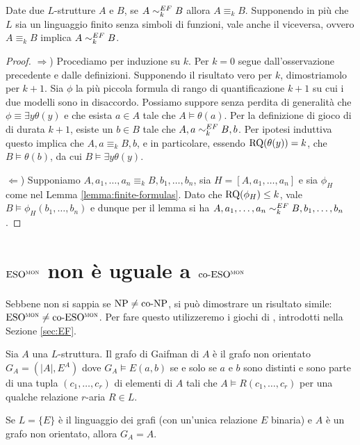 \begin{teorema}
 \label{thm:ef}
 Date due $L$-strutture $A$ e $B$, se $A \sim^{EF}_k B$ allora $A \equiv_k B$.
 Supponendo in più che $L$ sia un linguaggio finito senza simboli di funzioni,
 vale anche il viceversa, ovvero $A \equiv_k B$
 implica $A \sim^{EF}_k B$.
\end{teorema}
\begin{proof}
 $\Rightarrow$) Procediamo per induzione su $k$. Per $k=0$ segue dall'osservazione
 precedente e dalle definizioni. Supponendo il risultato vero per $k$, dimostriamolo
 per $k+1$. Sia $\phi$ la più piccola formula di rango di quantificazione $k+1$
 su cui i due modelli sono in disaccordo. Possiamo suppore senza perdita di generalità
 che $\phi \equiv \exists y \theta(y)$ e che esista $a \in A$ tale che $A \models \theta(a)$.
 Per la definizione di gioco di \EF{} di durata $k+1$, esiste un $b \in B$ tale che
 $A,a \sim^{EF}_k B,b$. Per ipotesi induttiva questo implica che
 $A,a \equiv_k B,b$, e in particolare, essendo $\operatorname{RQ}(\theta(y)) = k$, che
 $B \models \theta(b)$, da cui $B \models \exists y \theta(y)$.
 
 $\Leftarrow$) Supponiamo $A,a_1,\ldots, a_n \equiv_k B, b_1, \ldots, b_n$, sia
 $H=[A,a_1,\ldots,a_n]$ e sia $\phi_H$ come nel Lemma \ref{lemma:finite-formulas}.
 Dato che $\operatorname{RQ}(\phi_H) \leq k$, vale $B \models \phi_H(b_1,\ldots,b_n)$
 e dunque per il lemma si ha $A,a_1,\ldots, a_n \sim^{EF}_k B, b_1, \ldots, b_n$.
\end{proof}


\section{\texorpdfstring{$\operatorname{ESO^{\normalfont\textsc{mon}}}$}{E-SOmon} non è uguale a \texorpdfstring{$\operatorname{co-ESO^{\normalfont\textsc{mon}}}$}{coE-SOmon}}

Sebbene non si sappia se $\operatorname{NP}\neq\operatorname{co-NP}$, si può dimostrare un risultato simile: $\operatorname{ESO^{\normalfont\textsc{mon}}} \neq \operatorname{co-ESO^{\normalfont\textsc{mon}}}$.
Per fare questo utilizzeremo i giochi di \EF{}, introdotti nella Sezione \ref{sec:EF}.


\begin{definizione}
  Sia $A$ una $L$-struttura.
  Il grafo di Gaifman di $A$ è il grafo non orientato $G_A = (|A|, E^A)$ dove $G_A \models E(a,b)$ se e solo se $a$ e $b$ sono distinti e sono parte di una tupla $(c_1,\dots,c_r)$ di elementi di $A$ tali che $A\models R(c_1,\dots,c_r)$ per una qualche relazione $r$-aria $R\in L$.
\end{definizione}

\begin{osservazione}
  Se $L=\{E\}$ è il linguaggio dei grafi (con un'unica relazione $E$ binaria) e $A$ è un grafo non orientato, allora $G_A=A$.
\end{osservazione}

